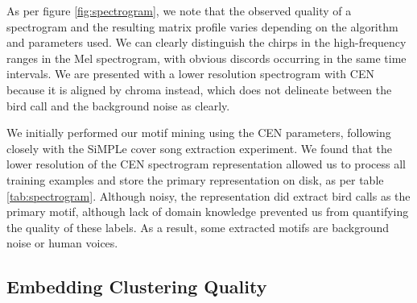 \documentclass[
]{ceurart}
\begin{document}
As per figure \ref{fig:spectrogram}, we note that the observed quality of a spectrogram and the resulting matrix profile varies depending on the algorithm and parameters used. We can clearly distinguish the chirps in the high-frequency ranges in the Mel spectrogram, with obvious discords occurring in the same time intervals. We are presented with a lower resolution spectrogram with CEN because it is aligned by chroma instead, which does not delineate between the bird call and the background noise as clearly.

We initially performed our motif mining using the CEN parameters, following closely with the SiMPLe cover song extraction experiment. We found that the lower resolution of the CEN spectrogram representation allowed us to process all training examples and store the primary representation on disk, as per table \ref{tab:spectrogram}. Although noisy, the representation did extract bird calls as the primary motif, although lack of domain knowledge prevented us from quantifying the quality of these labels. As a result, some extracted motifs are background noise or human voices.

\subsection{Embedding Clustering Quality}
\end{document}

